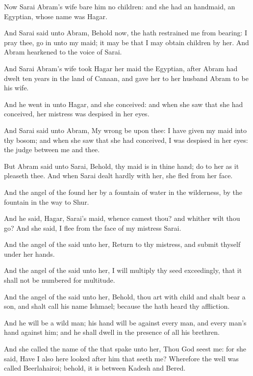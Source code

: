 \verse Now Sarai Abram's wife bare him no children: and she had an handmaid, an Egyptian, whose name was Hagar.

\verse And Sarai said unto Abram, Behold now, the \LORD hath restrained me from bearing: I pray thee, go in unto my maid; it may be that I may obtain children by her. And Abram hearkened to the voice of Sarai.

\verse And Sarai Abram's wife took Hagar her maid the Egyptian, after Abram had dwelt ten years in the land of Canaan, and gave her to her husband Abram to be his wife.

\verse And he went in unto Hagar, and she conceived: and when she saw that she had conceived, her mistress was despised in her eyes.

\verse And Sarai said unto Abram, My wrong be upon thee: I have given my maid into thy bosom; and when she saw that she had conceived, I was despised in her eyes: the \LORD judge between me and thee.

\verse But Abram said unto Sarai, Behold, thy maid is in thine hand; do to her as it pleaseth thee. And when Sarai dealt hardly with her, she fled from her face.

\verse And the angel of the \LORD found her by a fountain of water in the wilderness, by the fountain in the way to Shur.

\verse And he said, Hagar, Sarai's maid, whence camest thou? and whither wilt thou go? And she said, I flee from the face of my mistress Sarai.

\verse And the angel of the \LORD said unto her, Return to thy mistress, and submit thyself under her hands.

\verse And the angel of the \LORD said unto her, I will multiply thy seed exceedingly, that it shall not be numbered for multitude.

\verse And the angel of the \LORD said unto her, Behold, thou art with child and shalt bear a son, and shalt call his name Ishmael; because the \LORD hath heard thy affliction.

\verse And he will be a wild man; his hand will be against every man, and every man's hand against him; and he shall dwell in the presence of all his brethren.

\verse And she called the name of the \LORD that spake unto her, Thou God seest me: for she said, Have I also here looked after him that seeth me?  \verse Wherefore the well was called Beerlahairoi; behold, it is between Kadesh and Bered.

